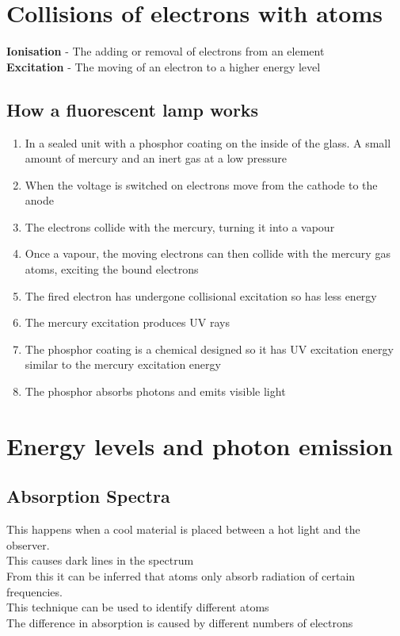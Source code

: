 \documentclass{article}[18pt]
\begin{document}
\section{Collisions of electrons with atoms}
\textbf{Ionisation} - The adding or removal of electrons from an element\\
\textbf{Excitation} - The moving of an electron to a higher energy level\\
\subsection{How a fluorescent lamp works}
\begin{enumerate}
\item In a sealed unit with a phosphor coating on the inside of the glass. A small amount of mercury and an inert gas at a low pressure
\item When the voltage is switched on electrons move from the cathode to the anode
\item The electrons collide with the mercury, turning it into a vapour
\item Once a vapour, the moving electrons can then collide with the mercury gas atoms, exciting the bound electrons
\item The fired electron has undergone collisional excitation so has less energy
\item The mercury excitation produces UV rays
\item The phosphor coating is a chemical designed so it has UV excitation energy similar to the mercury excitation energy
\item The phosphor absorbs photons and emits visible light
\end{enumerate}
\section{Energy levels and photon emission}
\subsection{Absorption Spectra}
This happens when a cool material is placed between a hot light and the observer.\\
This causes dark lines in the spectrum\\
From this it can be inferred that atoms only absorb radiation of certain frequencies.\\
This technique can be used to identify different atoms\\
The difference in absorption is caused by different numbers of electrons\\
\end{document}
